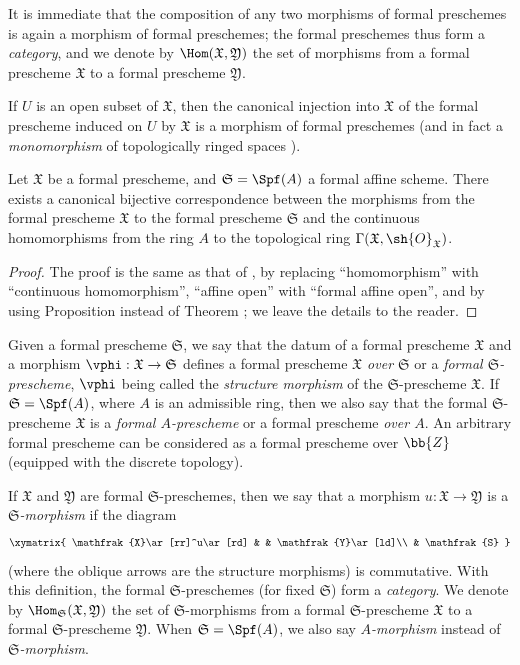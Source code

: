 It is immediate that the composition of any two morphisms of formal preschemes is again a morphism of formal preschemes; the formal preschemes thus form a \emph{category}, and we denote by $\Hom(\mathfrak{X},\mathfrak{Y})$ the set of morphisms from a formal prescheme $\mathfrak{X}$ to a formal prescheme $\mathfrak{Y}$.

If $U$ is an open subset of $\mathfrak{X}$, then the canonical injection into $\mathfrak{X}$ of the formal prescheme induced on $U$ by $\mathfrak{X}$ is a morphism of formal preschemes (and in fact a \emph{monomorphism} of topologically ringed spaces ).

\begin{proposition}[10.4.6]
\label{I.10.4.6}
Let $\mathfrak{X}$ be a formal prescheme, and $\mathfrak{S}=\Spf(A)$ a formal affine scheme.
There exists a canonical bijective correspondence between the morphisms from the formal prescheme $\mathfrak{X}$ to the formal prescheme $\mathfrak{S}$ and the continuous homomorphisms from the ring $A$ to the topological ring $\Gamma(\mathfrak{X},\sh{O}_\mathfrak{X})$.
\end{proposition}

\begin{proof}
The proof is the same as that of , by replacing ``homomorphism'' with ``continuous homomorphism'', ``affine open'' with ``formal affine open'', and by using Proposition  instead of Theorem ; we leave the details to the reader.
\end{proof}

\begin{env}[10.4.7]
\label{I.10.4.7}
Given a formal prescheme $\mathfrak{S}$, we say that the datum of a formal prescheme $\mathfrak{X}$ and a morphism $\vphi:\mathfrak{X}\to\mathfrak{S}$ defines a formal prescheme \emph{$\mathfrak{X}$ over $\mathfrak{S}$} or a \emph{formal $\mathfrak{S}$-prescheme}, $\vphi$ being called the \emph{structure morphism} of the $\mathfrak{S}$-prescheme $\mathfrak{X}$.
If $\mathfrak{S}=\Spf(A)$, where $A$ is an admissible ring, then we also say that the formal $\mathfrak{S}$-prescheme $\mathfrak{X}$ is a \emph{formal $A$-prescheme} or a formal prescheme \emph{over $A$}.
An arbitrary formal prescheme can be considered as a formal prescheme over $\bb{Z}$ (equipped with the discrete topology).

If $\mathfrak{X}$ and $\mathfrak{Y}$ are formal $\mathfrak{S}$-preschemes, then we say that a morphism $u:\mathfrak{X}\to\mathfrak{Y}$ is a \emph{$\mathfrak{S}$-morphism} if the diagram
\[
  \xymatrix{
    \mathfrak{X}\ar[rr]^u\ar[rd] & &
    \mathfrak{Y}\ar[ld]\\
    & \mathfrak{S}
  }
\]
(where the oblique arrows are the structure morphisms) is commutative.
With this definition, the formal $\mathfrak{S}$-preschemes (for fixed $\mathfrak{S}$) form a \emph{category}.
We denote by $\Hom_\mathfrak{S}(\mathfrak{X},\mathfrak{Y})$ the set of $\mathfrak{S}$-morphisms from a formal $\mathfrak{S}$-prescheme $\mathfrak{X}$ to a formal $\mathfrak{S}$-prescheme $\mathfrak{Y}$.
When $\mathfrak{S}=\Spf(A)$, we also say \emph{$A$-morphism} instead of \emph{$\mathfrak{S}$-morphism}.
\end{env}

